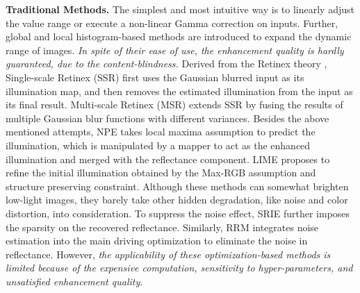 \documentclass[10pt,twocolumn,letterpaper]{article}
\begin{document}
\textbf{Traditional Methods.}
The simplest and most intuitive way is to linearly adjust the value range or execute a non-linear Gamma correction on inputs. Further, global and local histogram-based methods \cite{pisano1998contrast,cheng2004simple,abdullah2007dynamic,celik2011contextual,lee2013contrast} are introduced to expand the dynamic range of images. \emph{In spite of their ease of use, the enhancement quality is hardly guaranteed, due to the content-blindness.} Derived from the Retinex theory \cite{land1977retinex}, Single-scale Retinex (SSR) \cite{jobson1997properties} first uses the Gaussian blurred input as its illumination map, and then removes the estimated illumination from the input as its final result. Multi-scale Retinex (MSR) \cite{jobson1997multiscale} extends SSR by fusing the results of multiple Gaussian blur functions with different variances. Besides the above mentioned attempts, NPE \cite{wang2013naturalness} takes local maxima assumption to predict the illumination, which is manipulated by a mapper to act as the enhanced illumination and 
merged with the reflectance component. LIME \cite{guo2016lime} proposes to refine the initial illumination obtained by the Max-RGB assumption and structure preserving constraint. Although these methods can somewhat brighten low-light images, they barely take other hidden degradation, like noise and color distortion, into consideration. To suppress the noise effect, SRIE \cite{fu2016weighted} further imposes the sparsity on the recovered reflectance. Similarly, RRM \cite{li2018structure} integrates noise estimation into the main driving optimization to eliminate the noise in reflectance. However, \emph{the applicability of these optimization-based methods is limited because of the expensive computation, sensitivity to hyper-parameters, and unsatisfied enhancement quality.}
\end{document}
